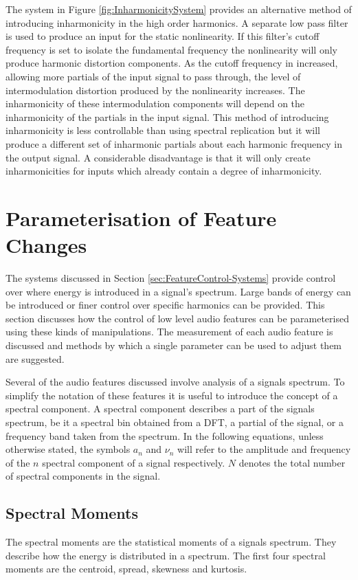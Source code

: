		The system in Figure \ref{fig:InharmonicitySystem} provides an alternative method of introducing
		inharmonicity in the high order harmonics. A separate low pass filter is used to produce an input for the
		static nonlinearity. If this filter's cutoff frequency is set to isolate the fundamental frequency the
		nonlinearity will only produce harmonic distortion components. As the cutoff frequency in increased,
		allowing more partials of the input signal to pass through, the level of intermodulation distortion
		produced by the nonlinearity increases. The inharmonicity of these intermodulation components will depend
		on the inharmonicity of the partials in the input signal. This method of introducing inharmonicity is less
		controllable than using spectral replication but it will produce a different set of inharmonic partials
		about each harmonic frequency in the output signal. A considerable disadvantage is that it will only create
		inharmonicities for inputs which already contain a degree of inharmonicity.

\section{Parameterisation of Feature Changes}
\label{sec:FeatureControl-Parameterisation}
	The systems discussed in Section \ref{sec:FeatureControl-Systems} provide control over where energy is introduced
	in a signal's spectrum. Large bands of energy can be introduced or finer control over specific harmonics can be
	provided. This section discusses how the control of low level audio features can be parameterised using these kinds
	of manipulations. The measurement of each audio feature is discussed and methods by which a single parameter can be
	used to adjust them are suggested.

	Several of the audio features discussed involve analysis of a signals spectrum. To simplify the notation of these
	features it is useful to introduce the concept of a spectral component. A spectral component describes a part of
	the signals spectrum, be it a spectral bin obtained from a DFT, a partial of the signal, or a frequency band taken
	from the spectrum. In the following equations, unless otherwise stated, the symbols $a_{n}$ and $\nu_{n}$ will
	refer to the amplitude and frequency of the $n$ spectral component of a signal respectively. $N$ denotes
	the total number of spectral components in the signal.

	\subsection{Spectral Moments}
	\label{sec:FeatureControl-Parameterisation-SpectralMoments}
		The spectral moments are the statistical moments of a signals spectrum. They describe how the energy is
		distributed in a spectrum. The first four spectral moments are the centroid, spread, skewness and kurtosis.
		
